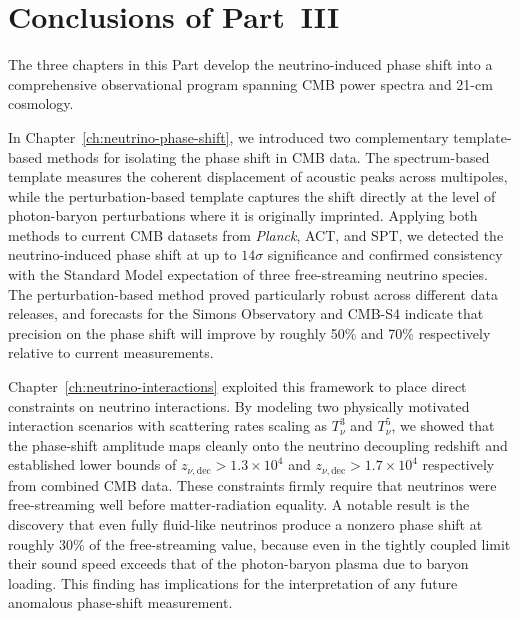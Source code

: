 \chapter*{Conclusions of Part~III}
\label{ch:part3-concl}

The three chapters in this Part develop the neutrino-induced phase shift into a comprehensive observational program spanning CMB power spectra and 21-cm cosmology.

In Chapter~\ref{ch:neutrino-phase-shift}, we introduced two complementary template-based methods for isolating the phase shift in CMB data. The spectrum-based template measures the coherent displacement of acoustic peaks across multipoles, while the perturbation-based template captures the shift directly at the level of photon-baryon perturbations where it is originally imprinted. Applying both methods to current CMB datasets from \textit{Planck}, ACT, and SPT, we detected the neutrino-induced phase shift at up to $14\sigma$ significance and confirmed consistency with the Standard Model expectation of three free-streaming neutrino species. The perturbation-based method proved particularly robust across different data releases, and forecasts for the Simons Observatory and CMB-S4 indicate that precision on the phase shift will improve by roughly 50\% and 70\% respectively relative to current measurements.

Chapter~\ref{ch:neutrino-interactions} exploited this framework to place direct constraints on neutrino interactions. By modeling two physically motivated interaction scenarios with scattering rates scaling as $T_\nu^3$ and $T_\nu^5$, we showed that the phase-shift amplitude maps cleanly onto the neutrino decoupling redshift and established lower bounds of $z_{\nu,\mathrm{dec}} > 1.3 \times 10^4$ and $z_{\nu,\mathrm{dec}} > 1.7 \times 10^4$ respectively from combined CMB data. These constraints firmly require that neutrinos were free-streaming well before matter-radiation equality. A notable result is the discovery that even fully fluid-like neutrinos produce a nonzero phase shift at roughly 30\% of the free-streaming value, because even in the tightly coupled limit their sound speed exceeds that of the photon-baryon plasma due to baryon loading. This finding has implications for the interpretation of any future anomalous phase-shift measurement.


